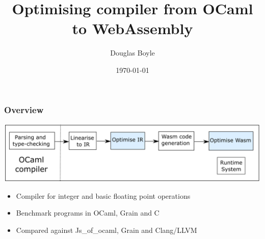 \documentclass{beamer}
\title[]{Optimising compiler from OCaml to WebAssembly} %
\author{Douglas Boyle} %
\date{\today}
\begin{document}
\begin{frame}
\titlepage %
\end{frame}



\begin{frame}\frametitle{Overview} 
\includegraphics[scale=0.37]{overview}
\begin{itemize}
\item Compiler for integer and basic floating point operations
\item Benchmark programs in OCaml, Grain and C
\item Compared against Js\_of\_ocaml, Grain and Clang/LLVM
\end{itemize}
\end{frame}
\end{document}
